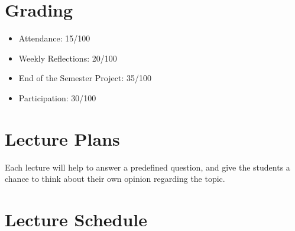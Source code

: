 \documentclass[fleqn,10pt]{wlscirep}
\begin{document}
\section*{Grading}
\begin{itemize}
    \item Attendance: 15/100
    \item Weekly Reflections: 20/100
    \item End of the Semester Project: 35/100
    \item Participation: 30/100

\end{itemize}

\section*{Lecture Plans}
Each lecture will help to answer a predefined question, and give the students a chance to think about their own opinion regarding the topic. 

\section*{Lecture Schedule}
\end{document}

